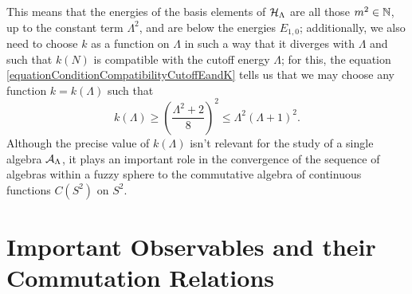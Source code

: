 This means that the energies of the basis elements of $\mathcal H_\Lambda$ are all those $m^2 \in \mathbb{N}$, up to the constant term $\Lambda^2$, and are below the energies $E_{1,0}$; additionally, we also need to choose $k$ as a function on $\Lambda$ in such a way that it diverges with $\Lambda$ and such that $k(N)$ is compatible with the cutoff energy $\Lambda$; for this, the equation \eqref{equationConditionCompatibilityCutoffEandK} tells us that we may choose any function $k = k(\Lambda)$ such that
\begin{equation}\label{inequationInequalityNeededforKasFunctionLambdaD2}
    k(\Lambda) \geq  \left( \frac{\Lambda^2 + 2}{8} \right)^2\leq \Lambda^2 (\Lambda + 1)^2.
\end{equation}
Although the precise value of $k(\Lambda)$ isn't relevant for the study of a single algebra $\mathcal A_\Lambda$, it plays an important role in the convergence of the sequence of algebras within a fuzzy sphere to the commutative algebra of continuous functions $C(S^2)$ on $S^2$.%


\section{Important Observables and their Commutation Relations}
\label{chNewFuzzySectionObservables}

    
     
